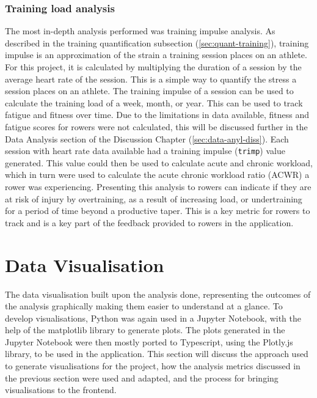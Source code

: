 \subsubsection{Training load analysis}
The most in-depth analysis performed was training impulse analysis. As described in the training quantification subsection (\autoref{sec:quant-training}), training impulse is an approximation of the strain a training session places on an athlete. For this project, it is calculated by multiplying the duration of a session by the average heart rate of the session. This is a simple way to quantify the stress a session places on an athlete. The training impulse of a session can be used to calculate the training load of a week, month, or year. This can be used to track fatigue and fitness over time. Due to the limitations in data available, fitness and fatigue scores for rowers were not calculated, this will be discussed further in the Data Analysis section of the Discussion Chapter (\ref{sec:data-anyl-diss}).
Each session with heart rate data available had a training impulse (\texttt{trimp}) value generated. This value could then be used to calculate acute and chronic workload, which in turn were used to calculate the acute chronic workload ratio (ACWR) a rower was experiencing. Presenting this analysis to rowers can indicate if they are at risk of injury by overtraining, as a result of increasing load, or undertraining for a period of time beyond a productive taper. This is a key metric for rowers to track and is a key part of the feedback provided to rowers in the application.

\section{\label{sec:data-viz}Data Visualisation}
The data visualisation built upon the analysis done, representing the outcomes of the analysis graphically making them easier to understand at a glance. To develop visualisations, Python was again used in a Jupyter Notebook, with the help of the matplotlib library to generate plots. The plots generated in the Jupyter Notebook were then mostly ported to Typescript, using the Plotly.js library, to be used in the application. This section will discuss the approach used to generate visualisations for the project, how the analysis metrics discussed in the previous section were used and adapted, and the process for bringing visualisations to the frontend.

